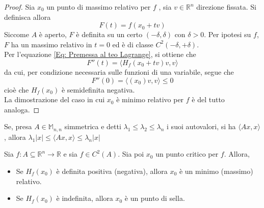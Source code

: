 \begin{proof}
    Sia $x_0$ un punto di massimo relativo per $f$ , sia $v \in \mathbb{R}^n$ direzione fissata. Si definisca allora
    \begin{equation}
    F(t)=f(x_0+tv)
    \end{equation}
    Siccome $A$ è aperto, $F$ è definita su un certo $\left(-\delta, \delta\right)$ con $\delta>0$. Per ipotesi su $f$, $F$ ha un massimo relativo in $t=0$ ed è di classe $C^2(-\delta, +\delta)$.\\
    Per l'equazione \eqref{Eq: Premessa al teo Lagrange}, si ottiene che
    \begin{equation}
        F''(t)= \langle H_f(x_0+tv)v, v \rangle 
    \end{equation}
    da cui, per condizione necessaria sulle funzioni di una variabile, segue che
    \begin{equation}
        F''(0)= \langle (x_0)v, v \rangle \leq 0
    \end{equation}
    cioè che $H_f(x_0)$ è semidefinita negativa.\\
    La dimostrazione del caso in cui $x_0$ è minimo relativo per $f$ è del tutto analoga.
\end{proof}
\begin{lemma} \label{Lemma: FQ di matrice simmetrica è compresa tra i suoi autovalori max e min}
        Se, presa $A \in \mathbb{M}_{n,n}$ simmetrica e detti $\lambda_1 \leq \lambda_2 \leq \lambda_n$ i suoi autovalori, si ha $\langle Ax, x \rangle$, allora $\lambda_1 |x| \leq \langle Ax, x \rangle \leq \lambda_n |x|$
\end{lemma}
\begin{theorem} \label{Teo: Condizione sufficiente del secondo ordine}
    Sia $f:A \subseteq \mathbb{R}^n \to \mathbb{R}$ e sia $f \in C^2(A)$. Sia poi $x_0$ un punto critico per $f$. Allora, 
    \begin{itemize}
        \item Se $H_f(x_0)$ è definita positiva (negativa), allora $x_0$ è un minimo (massimo) relativo.
        \item Se $H_f(x_0)$ è indefinita, allora $x_0$ è un punto di sella.
    \end{itemize}
\end{theorem}
